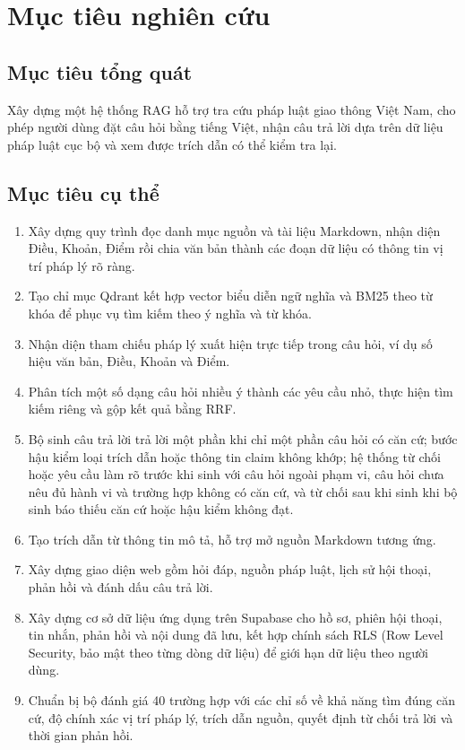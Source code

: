 \documentclass[12pt,a4paper,oneside]{report}
\begin{document}
\section{Mục tiêu nghiên cứu}
\subsection{Mục tiêu tổng quát}
Xây dựng một hệ thống RAG hỗ trợ tra cứu pháp luật giao thông Việt Nam, cho phép người dùng đặt câu hỏi bằng tiếng Việt, nhận câu trả lời dựa trên dữ liệu pháp luật cục bộ và xem được trích dẫn có thể kiểm tra lại.

\subsection{Mục tiêu cụ thể}
\begin{enumerate}
  \item Xây dựng quy trình đọc danh mục nguồn và tài liệu Markdown, nhận diện Điều, Khoản, Điểm rồi chia văn bản thành các đoạn dữ liệu có thông tin vị trí pháp lý rõ ràng.
  \item Tạo chỉ mục Qdrant kết hợp vector biểu diễn ngữ nghĩa và BM25 theo từ khóa để phục vụ tìm kiếm theo ý nghĩa và từ khóa.
  \item Nhận diện tham chiếu pháp lý xuất hiện trực tiếp trong câu hỏi, ví dụ số hiệu văn bản, Điều, Khoản và Điểm.
  \item Phân tích một số dạng câu hỏi nhiều ý thành các yêu cầu nhỏ, thực hiện tìm kiếm riêng và gộp kết quả bằng RRF.
  \item Bộ sinh câu trả lời trả lời một phần khi chỉ một phần câu hỏi có căn cứ; bước hậu kiểm loại trích dẫn hoặc thông tin claim không khớp; hệ thống từ chối hoặc yêu cầu làm rõ trước khi sinh với câu hỏi ngoài phạm vi, câu hỏi chưa nêu đủ hành vi và trường hợp không có căn cứ, và từ chối sau khi sinh khi bộ sinh báo thiếu căn cứ hoặc hậu kiểm không đạt.
  \item Tạo trích dẫn từ thông tin mô tả, hỗ trợ mở nguồn Markdown tương ứng.
  \item Xây dựng giao diện web gồm hỏi đáp, nguồn pháp luật, lịch sử hội thoại, phản hồi và đánh dấu câu trả lời.
  \item Xây dựng cơ sở dữ liệu ứng dụng trên Supabase cho hồ sơ, phiên hội thoại, tin nhắn, phản hồi và nội dung đã lưu, kết hợp chính sách RLS (Row Level Security, bảo mật theo từng dòng dữ liệu) để giới hạn dữ liệu theo người dùng.
  \item Chuẩn bị bộ đánh giá 40 trường hợp với các chỉ số về khả năng tìm đúng căn cứ, độ chính xác vị trí pháp lý, trích dẫn nguồn, quyết định từ chối trả lời và thời gian phản hồi.
\end{enumerate}
\end{document}
